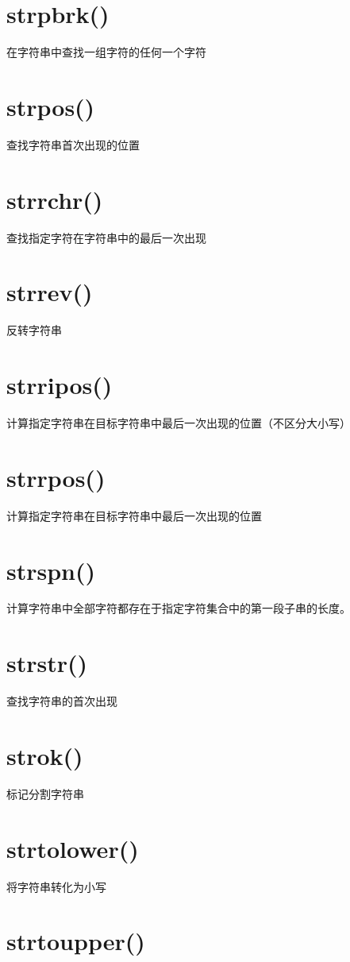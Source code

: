 \section{strpbrk()}

在字符串中查找一组字符的任何一个字符


\section{strpos()}
查找字符串首次出现的位置

\section{strrchr()}

查找指定字符在字符串中的最后一次出现
\section{strrev()}

反转字符串
\section{strripos()}

计算指定字符串在目标字符串中最后一次出现的位置（不区分大小写）
\section{strrpos()}
计算指定字符串在目标字符串中最后一次出现的位置

\section{strspn()}
计算字符串中全部字符都存在于指定字符集合中的第一段子串的长度。

\section{strstr()}
查找字符串的首次出现

\section{strok()}

标记分割字符串
\section{strtolower()}

将字符串转化为小写
\section{strtoupper()}

